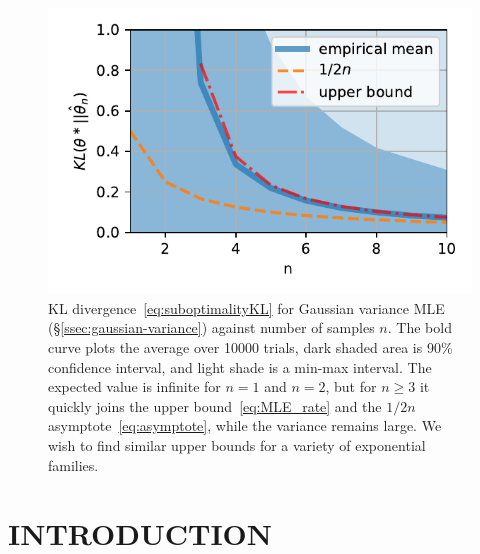 \documentclass[twoside]{article}
\begin{document}

\begin{figure}[t]
	\centering
\includegraphics[width=.4\textwidth]{fewsamples.pdf}
	\caption{KL divergence~\eqref{eq:suboptimalityKL} for Gaussian variance MLE (\S\ref{ssec:gaussian-variance}) against number of samples $n$. The bold curve plots the average over 10000 trials,  dark shaded area is 90\% confidence interval, and light shade is a min-max interval.
		The expected value is infinite for $n=1$ and $n=2$, but for $n\geq3$ it quickly joins the upper bound~\eqref{eq:MLE_rate} and the $1/2n$ asymptote~\eqref{eq:asymptote}, while the variance remains large.
		We wish to find similar upper bounds for a variety of exponential families.
	}
	\label{fig:curves}
\end{figure}


\section{INTRODUCTION}
\label{sec:motivation}
\end{document}
